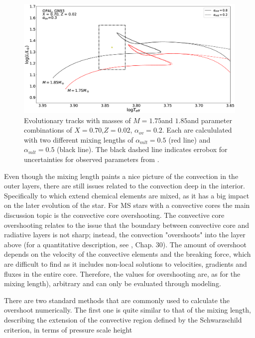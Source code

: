 \begin{figure}[htbp]
    \centering
    \includegraphics[width=1\textwidth]{mlt.eps}
    \caption{Evolutionary tracks with masses of $M=1.75$\msun and $1.85$\msun and parameter combinations of $X=0.70$,$Z=0.02$, $\alpha_{ov}=0.2$. Each are calcululated with two different mixing lengths of $\alpha_{mlt}=0.5$ (red line) and $\alpha_{mlt}=0.5$ (black line). The black dashed line indicates errobox for uncertainties for observed parameters from \citet{lenz2010delta}.}
    \label{mlt}
\end{figure}

Even though the mixing length paints a nice picture of the convection in the outer layers, there are still issues related to the convection deep in the interior. Specifically to which extend chemical elements are mixed, as it has a big impact on the later evolution of the star. For MS stars with a convective cores the main discussion topic is the convective core overshooting. The convective core overshooting relates to the issue that the boundary between convective core and radiative layers is not sharp; instead, the convection "overshoots" into the layer above (for a quantitative description, see \citet{kippenhahn1990stellar}, Chap. 30). The amount of overshoot depends on the velocity of the convective elements and the breaking force, which are difficult to find as it includes non-local solutions to velocities, gradients and fluxes in the entire core. Therefore, the values for overshooting are, as for the mixing length), arbitrary and can only be evaluated through modeling. 

There are two standard methods that are commonly used to calculate the overshoot numerically. The first one is quite similar to that of the mixing length, describing the extension of the convective region defined by the Schwarzschild criterion, in terms of pressure scale height

